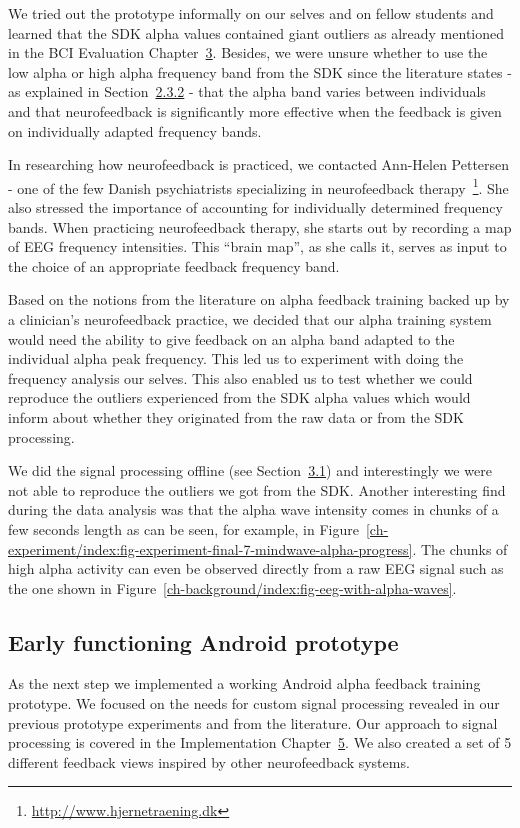 \documentclass[a4paper,10pt,english,lof,lot,twoside]{puthesis}
\begin{document}
We tried out the prototype informally on our selves and on fellow students and
learned that the SDK alpha values contained giant outliers as already mentioned
in the BCI Evaluation Chapter {\hyperref[ch-experiment/index:ch-experiment]{3}}. Besides, we were
unsure whether to use the low alpha or high alpha frequency band from the SDK
since the literature states - as explained in Section {\hyperref[ch-background/index:sec-background-stress-alpha-feedback-training]{2.3.2}} - that the alpha band
varies between individuals and that neurofeedback is significantly more
effective when the feedback is given on individually adapted frequency bands.

In researching how neurofeedback is practiced, we contacted Ann-Helen
Pettersen - one of the few Danish psychiatrists specializing in neurofeedback
therapy \footnote{
\href{http://www.hjernetraening.dk}{http://www.hjernetraening.dk}
}.  She also stressed the
importance of accounting for individually determined frequency bands.  When
practicing neurofeedback therapy, she starts out by recording a map of EEG
frequency intensities. This ``brain map'', as she calls it, serves as input to the
choice of an appropriate feedback frequency band.

Based on the notions from the literature on alpha feedback training backed up by a
clinician's neurofeedback practice, we decided that our alpha training system
would need the ability to give feedback on an alpha band adapted to the
individual alpha peak frequency. This led us to experiment with doing the
frequency analysis our selves. This
also enabled us to test whether we could reproduce the outliers experienced from
the SDK alpha values which would inform about whether they originated from the
raw data or from the SDK processing.

We did the signal processing offline (see Section {\hyperref[ch-experiment/index:ch-experiment-pre-study]{3.1}}) and interestingly we were not able to reproduce
the outliers we got from the SDK. Another interesting find during the data
analysis was that the alpha wave intensity comes in chunks of a few seconds
length as can be seen, for example, in Figure \ref{ch-experiment/index:fig-experiment-final-7-mindwave-alpha-progress}.  The chunks of high alpha
activity can even be observed directly from a raw EEG signal such as the one
shown in Figure \ref{ch-background/index:fig-eeg-with-alpha-waves}.


\subsection{Early functioning Android prototype}
\label{ch-design/index:early-functioning-android-prototype}
As the next step we implemented a working Android alpha feedback training
prototype. We focused on the needs for custom signal processing revealed in our
previous prototype experiments and from the literature. Our approach to signal
processing is covered in the Implementation Chapter {\hyperref[ch-implementation/index:ch-implementation]{5}}. We also created a set of 5 different feedback views
inspired by other neurofeedback systems.
\end{document}
